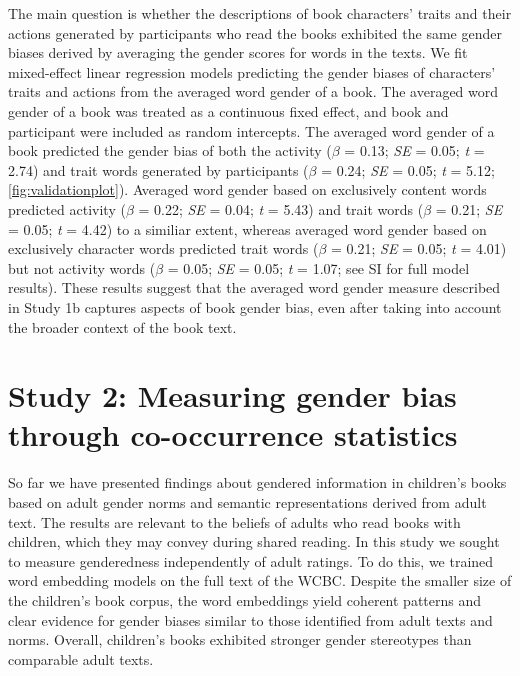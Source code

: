 \documentclass[
  english,
  ,man,floatsintext]{apa6}
\begin{document}
The main question is whether the descriptions of book characters' traits and their actions generated by participants who read the books exhibited the same gender biases derived by averaging the gender scores for words in the texts. We fit mixed-effect linear regression models predicting the gender biases of characters' traits and actions from the averaged word gender of a book. The averaged word gender of a book was treated as a continuous fixed effect, and book and participant were included as random intercepts. The averaged word gender of a book predicted the gender bias of both the activity (\(\beta\) = 0.13; \emph{SE} = 0.05; \emph{t} = 2.74) and trait words generated by participants (\(\beta\) = 0.24; \emph{SE} = 0.05; \emph{t} = 5.12; \autoref{fig:validationplot}). Averaged word gender based on exclusively content words predicted activity (\(\beta\) = 0.22; \emph{SE} = 0.04; \emph{t} = 5.43) and trait words (\(\beta\) = 0.21; \emph{SE} = 0.05; \emph{t} = 4.42) to a similiar extent, whereas averaged word gender based on exclusively character words predicted trait words (\(\beta\) = 0.21; \emph{SE} = 0.05; \emph{t} = 4.01) but not activity words (\(\beta\) = 0.05; \emph{SE} = 0.05; \emph{t} = 1.07; see SI for full model results). These results suggest that the averaged word gender measure described in Study 1b captures aspects of book gender bias, even after taking into account the broader context of the book text.

\hypertarget{study-2-measuring-gender-bias-through-co-occurrence-statistics}{%
\section{Study 2: Measuring gender bias through co-occurrence statistics}\label{study-2-measuring-gender-bias-through-co-occurrence-statistics}}

So far we have presented findings about gendered information in children's books based on adult gender norms and semantic representations derived from adult text. The results are relevant to the beliefs of adults who read books with children, which they may convey during shared reading. In this study we sought to measure genderedness independently of adult ratings. To do this, we trained word embedding models on the full text of the WCBC. Despite the smaller size of the children's book corpus, the word embeddings yield coherent patterns and clear evidence for gender biases similar to those identified from adult texts and norms. Overall, children's books exhibited stronger gender stereotypes than comparable adult texts.
\end{document}
